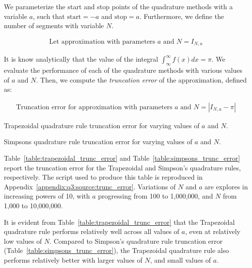 \documentclass[10pt]{article}
\begin{document}
    We parameterize the start and stop points of the quadrature methods with a variable $a$, such that ${\text{start} = -a}$ and ${\text{stop} = a}$. Furthermore, we define the number of segments with variable $N$.

    \begin{gather*}
        \text{Let approximation with parameters $a$ and $N$} = I_{N,a}
    \end{gather*}

    It is know analytically that the value of the integral $\int_\infty^\infty f(x) dx = \pi$. We evaluate the performance of each of the quadrature methods with various values of $a$ and $N$. Then, we compute the \textit{truncation error} of the approximation, defined as:

    \begin{gather*}
        \text{Truncation error for approximation with parameters $a$ and $N$} = \left| I_{N,a} - \pi \right|
    \end{gather*}

    \begin{table}[h]
        \centering
        \caption{Trapezoidal quadrature rule truncation error for varying values of $a$ and $N$.}
        \label{table:trapezoidal_trunc_error}
    \end{table}

    \begin{table}[h]
        \centering
        \caption{Simpsons quadrature rule truncation error for varying values of $a$ and $N$.}
        \label{table:simpsons_trunc_error}
    \end{table}

    Table~\ref{table:trapezoidal_trunc_error} and Table~\ref{table:simpsons_trunc_error} report the truncation error for the Trapezoidal and Simpson's quadrature rules, respectively. The script used to produce this table is reproduced in Appendix~\ref{appendix:q3:source:trunc_error}. Variations of $N$ and $a$ are explores in increasing powers of 10, with $a$ progressing from 100 to 1,000,000, and $N$ from 1,000 to 10,000,000.

    It is evident from Table~\ref{table:trapezoidal_trunc_error} that the Trapezoidal quadrature rule performs relatively well across all values of $a$, even at relatively low values of $N$. Compared to Simpson's quadrature rule truncation error (Table~\ref{table:simpsons_trunc_error}), the Trapezoidal quadrature rule also performs relatively better with larger values of $N$, and small values of $a$.
    
\end{document}
